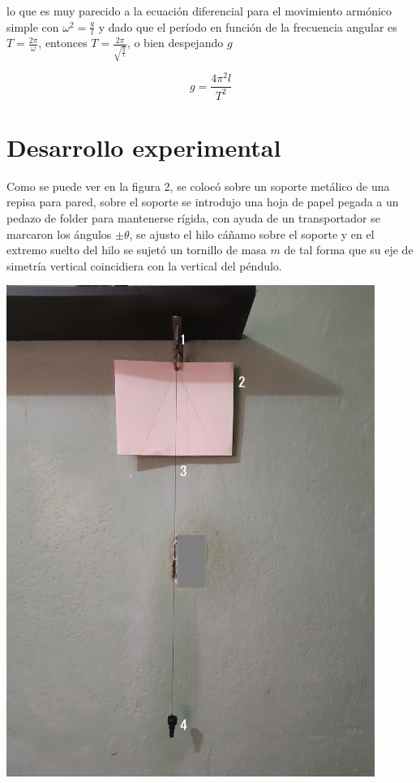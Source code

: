 \documentclass[DIV=calc, paper=a4, fontsize=11pt]{scrartcl}
\newenvironment{Figura}
  {\par\medskip\noindent\minipage{\linewidth}}
  {\endminipage\par\medskip}
\begin{document}
\begin{multicols}{2}
\noindent lo que es muy parecido a la ecuación diferencial para el movimiento armónico simple con $\omega ^2 = \frac{g}{l}$ y dado que el período en función de la frecuencia angular es $T =\frac{ 2 \pi} {\omega}$, entonces $T= \frac{2\pi} {\sqrt{\frac{g}{l}}}$, o bien despejando $g$

\begin{equation}
    g = \frac{4 \pi^2 l}{T^2}
\end{equation}



\section*{Desarrollo experimental}




Como se puede ver en la figura 2, se colocó sobre un soporte metálico de una repisa para pared, sobre el soporte se introdujo una hoja de papel pegada a un pedazo de folder para mantenerse rígida, con ayuda de un transportador se marcaron los ángulos $\pm \theta$, se ajusto el hilo cáñamo sobre el soporte y en el extremo suelto del hilo se sujetó un tornillo de masa $m$ de tal forma que su eje de simetría vertical coincidiera con la vertical del péndulo.


\begin{Figura}
    \centering
    \includegraphics[width=0.9\textwidth]{20220219_161348.jpg}
    \label{fig}
\end{Figura}


\end{multicols}
\end{document}
